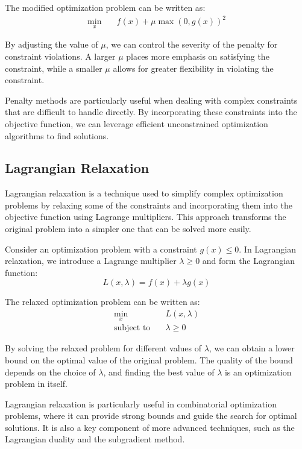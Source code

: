 The modified optimization problem can be written as:
\begin{align*}
	\min_{x} \quad & f(x) + \mu \max(0, g(x))^2
\end{align*}

By adjusting the value of \( \mu \), we can control the severity of the penalty for constraint violations.
A larger \( \mu \) places more emphasis on satisfying the constraint, while a smaller \( \mu \) allows for greater flexibility in violating the
constraint.

Penalty methods are particularly useful when dealing with complex constraints that are difficult to handle directly.
By incorporating these constraints into the objective function, we can leverage efficient unconstrained optimization algorithms to find solutions.

\subsection{Lagrangian Relaxation}

Lagrangian relaxation is a technique used to simplify complex optimization problems by relaxing some of the constraints and incorporating them into
the objective function using Lagrange multipliers.
This approach transforms the original problem into a simpler one that can be solved more easily.

Consider an optimization problem with a constraint \( g(x) \leq 0 \).
In Lagrangian relaxation, we introduce a Lagrange multiplier \( \lambda \geq 0 \) and form the Lagrangian function:
\[
	L(x, \lambda) = f(x) + \lambda g(x)
\]

The relaxed optimization problem can be written as:
\begin{align*}
	\min_{x} \quad          & L(x, \lambda)  \\
	\text{subject to} \quad & \lambda \geq 0
\end{align*}

By solving the relaxed problem for different values of \( \lambda \), we can obtain a lower bound on the optimal value of the original problem.
The quality of the bound depends on the choice of \( \lambda \), and finding the best value of \( \lambda \) is an optimization problem in itself.

Lagrangian relaxation is particularly useful in combinatorial optimization problems, where it can provide strong bounds and guide the search for
optimal solutions.
It is also a key component of more advanced techniques, such as the Lagrangian duality and the subgradient method.

